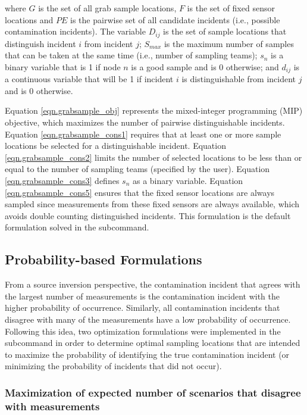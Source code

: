 where $G$ is the set of all grab sample locations, $F$ is the set of
fixed sensor locations and $PE$ is the pairwise set of all candidate
incidents (i.e., possible contamination incidents). The variable $D_{ij}$ is
the set of sample locations that distinguish incident $i$ from
incident $j$; $S_{max}$ is the maximum number of samples that can be
taken at the same time (i.e., number of sampling teams); $s_n$ is a
binary variable that is 1 if node $n$ is a good sample and is 0 otherwise; and
$d_{ij}$ is a continuous variable that will be 1 if incident $i$ is
distinguishable from incident $j$ and is 0 otherwise.

Equation \ref{eqn.grabsample_obj} represents the mixed-integer programming (MIP) objective, which
maximizes the number of pairwise distinguishable incidents.
Equation \ref{eqn.grabsample_cons1} requires that at least one or more
sample locations be selected for a distinguishable incident.
Equation \ref{eqn.grabsample_cons2} limits the number of selected
locations to be less than or equal to the number of sampling teams (specified by the user).
Equation \ref{eqn.grabsample_cons3} defines $s_n$ as a binary variable. 
Equation \ref{eqn.grabsample_cons5} ensures that the fixed sensor
locations are always sampled since measurements from these fixed sensors 
are always available, which avoids double counting distinguished incidents. This formulation is the default formulation solved in the  subcommand.  

\subsection{Probability-based Formulations}
\label{probabilityFormulations}
From a source inversion perspective, the contamination incident that agrees with the largest number of measurements is the contamination incident with the higher probability of occurrence. Similarly, all contamination incidents that disagree with many of the measurements have a low probability of occurrence. Following this idea, two optimization formulations were implemented in the  subcommand in order to determine optimal sampling locations that are intended to maximize the probability of identifying the true contamination incident (or minimizing the probability of incidents that did not occur).

\subsubsection{Maximization of expected number of scenarios that disagree with measurements}

